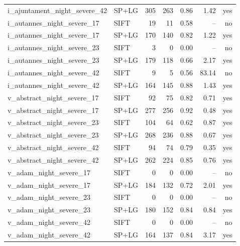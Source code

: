 \begin{longtable}{llrrrrr}
i\_ajuntament\_night\_severe\_42 & SP+LG & 305 & 263 & 0.86 & 1.42 & yes \\
i\_autannes\_night\_severe\_17 & SIFT & 19 & 11 & 0.58 & -- & no \\
i\_autannes\_night\_severe\_17 & SP+LG & 170 & 140 & 0.82 & 1.22 & yes \\
i\_autannes\_night\_severe\_23 & SIFT & 3 & 0 & 0.00 & -- & no \\
i\_autannes\_night\_severe\_23 & SP+LG & 179 & 118 & 0.66 & 2.17 & yes \\
i\_autannes\_night\_severe\_42 & SIFT & 9 & 5 & 0.56 & 83.14 & no \\
i\_autannes\_night\_severe\_42 & SP+LG & 164 & 145 & 0.88 & 1.43 & yes \\
v\_abstract\_night\_severe\_17 & SIFT & 92 & 75 & 0.82 & 0.71 & yes \\
v\_abstract\_night\_severe\_17 & SP+LG & 277 & 256 & 0.92 & 0.48 & yes \\
v\_abstract\_night\_severe\_23 & SIFT & 104 & 64 & 0.62 & 0.87 & yes \\
v\_abstract\_night\_severe\_23 & SP+LG & 268 & 236 & 0.88 & 0.67 & yes \\
v\_abstract\_night\_severe\_42 & SIFT & 94 & 74 & 0.79 & 0.35 & yes \\
v\_abstract\_night\_severe\_42 & SP+LG & 262 & 224 & 0.85 & 0.76 & yes \\
v\_adam\_night\_severe\_17 & SIFT & 0 & 0 & 0.00 & -- & no \\
v\_adam\_night\_severe\_17 & SP+LG & 184 & 132 & 0.72 & 2.01 & yes \\
v\_adam\_night\_severe\_23 & SIFT & 0 & 0 & 0.00 & -- & no \\
v\_adam\_night\_severe\_23 & SP+LG & 180 & 152 & 0.84 & 0.84 & yes \\
v\_adam\_night\_severe\_42 & SIFT & 0 & 0 & 0.00 & -- & no \\
v\_adam\_night\_severe\_42 & SP+LG & 164 & 137 & 0.84 & 3.17 & yes \\
\end{longtable}\endgroup
